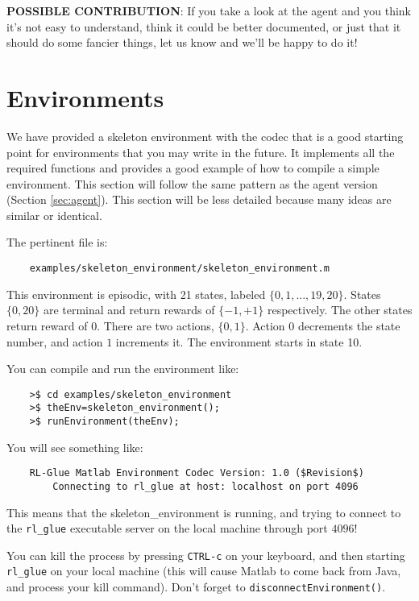 \documentclass[11pt]{article}
\begin{document}
\textbf{POSSIBLE CONTRIBUTION}: If you take a look at the agent and you think it's not easy to understand, think it could be better documented, 
or just that it should do some fancier things, let us know and we'll be happy to do it!


\section{Environments}
\label{sec:env}

We have provided a skeleton environment with the codec that is a good starting point for environments that you may write in the future.
It implements all the required functions and provides a good example of how to compile a simple environment.  This section will follow the same 
pattern as the agent version (Section \ref{sec:agent}).  This section will be less detailed because many ideas are similar or identical.


The pertinent file is:
\begin{verbatim}
	examples/skeleton_environment/skeleton_environment.m
\end{verbatim}

This environment is episodic, with 21 states, labeled $\{0, 1,\ldots,19,20\}$. States $\{0, 20\}$ are terminal and return rewards of $\{-1, +1\}$ respectively.  The other states return reward of $0$.
There are two actions, $\{0, 1\}$.  Action $0$ decrements the state number, and action $1$ increments it. The environment starts in state 10.

You can compile and run the environment like:
\begin{verbatim}
	>$ cd examples/skeleton_environment
	>$ theEnv=skeleton_environment();
	>$ runEnvironment(theEnv);
\end{verbatim}

You will see something like:
\begin{verbatim}
	RL-Glue Matlab Environment Codec Version: 1.0 ($Revision$)
	    Connecting to rl_glue at host: localhost on port 4096
	\end{verbatim}

This means that the skeleton\_environment is running, and trying to connect to the \texttt{rl\_glue} executable server on the local machine through port $4096$! 

You can kill the process by pressing \texttt{CTRL-c} on your keyboard, and then starting  \texttt{rl\_glue} on your local machine (this will cause Matlab to come back from Java, and 
process your kill command).  Don't forget to \texttt{disconnectEnvironment()}.
\end{document}
